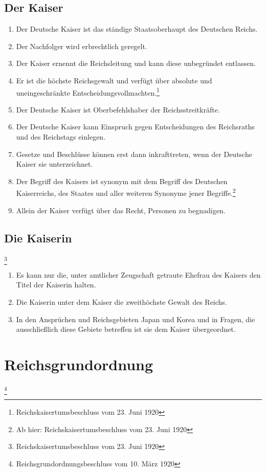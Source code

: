 \documentclass{article}
\newenvironment*{pg}{\begin{enumerate}[(1)]}{\end{enumerate}}
\begin{document}
\subsection{Der Kaiser}
\begin{pg}
    \item Der Deutsche Kaiser ist das ständige Staatsoberhaupt des Deutschen Reichs.
    \item Der Nachfolger wird erbrechtlich geregelt.
    \item Der Kaiser ernennt die Reichsleitung und kann diese unbegründet entlassen.
    \item Er ist die höchste Reichsgewalt und verfügt über absolute und uneingeschränkte Entscheidungsvollmachten.\footnote{Reichskaisertumsbeschluss vom 23. Juni 1920}
    \item Der Deutsche Kaiser ist Oberbefehlshaber der Reichsstreitkräfte.
    \item Der Deutsche Kaiser kann Einspruch gegen Entscheidungen des Reichsraths und des Reichstags einlegen.
    \item Gesetze und Beschlüsse können erst dann inkrafttreten, wenn der Deutsche Kaiser sie unterzeichnet.
    \item Der Begriff des Kaisers ist synonym mit dem Begriff des Deutschen Kaiserreichs, des Staates und aller weiteren Synonyme jener Begriffe.\footnote{Ab hier: Reichskaisertumsbeschluss vom 23. Juni 1920}
    \item Allein der Kaiser verfügt über das Recht, Personen zu begnadigen.
\end{pg}

\subsection{Die Kaiserin}\footnote{Reichskaisertumsbeschluss vom 23. Juni 1920}
\begin{enumerate}[(1)]
    \item Es kann nur die, unter amtlicher Zeugschaft getraute Ehefrau des Kaisers den Titel der Kaiserin halten.
    \item Die Kaiserin unter dem Kaiser die zweithöchste Gewalt des Reichs.
    \item In den Ansprüchen und Reichsgebieten Japan und Korea und in Fragen, die ausschließlich diese Gebiete betreffen ist sie dem Kaiser übergeordnet.
\end{enumerate}

\section{Reichsgrundordnung}\footnote{Reichsgrundordnungsbeschluss vom 10. März 1920}
\end{document}

